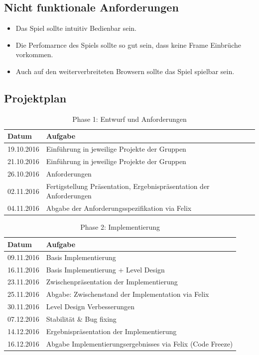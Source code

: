 \subsection{Nicht funktionale Anforderungen}
\begin{itemize}
	\item Das Spiel sollte intuitiv Bedienbar sein.
	\item Die Perfomarnce des Spiels sollte so gut sein, dass keine Frame Einbrüche vorkommen.
	\item Auch auf den weiterverbreiteten Browsern sollte das Spiel spielbar sein.
\end{itemize}
\subsection{Projektplan}
\begin{table}[h]
	\begin{tabular}{l|l}
		\toprule
		\textbf{Datum}& \textbf{Aufgabe}\\
		\midrule
		19.10.2016 & Einführung in jeweilige Projekte der Gruppen 	\\ 
		21.10.2016 & Einführung in jeweilige Projekte der Gruppen	\\
		26.10.2016 & Anforderungen	\\ 
		02.11.2016 & Fertigstellung Präsentation, Ergebnispräsentation der Anforderungen \\
		04.11.2016 & Abgabe der Anforderungsspezifikation via Felix \\
		\bottomrule
	\end{tabular}
	\caption{Phase 1: Entwurf und Anforderungen}
\end{table}
\begin{table}[h]
	\begin{tabular}{l|l}
		\toprule
		\textbf{Datum}& \textbf{Aufgabe}\\
		\midrule
		09.11.2016 & Basis Implementierung 	\\ 
		16.11.2016 & Basis Implementierung + Level Design	\\
		23.11.2016 & Zwischenpräsentation der Implementierung	\\ 
		25.11.2016 & Abgabe: Zwischenstand der Implementation via Felix\\
		30.11.2016 & Level Design Verbesserungen \\
		07.12.2016 & Stabilität \& Bug fixing \\
		14.12.2016 & Ergebnispräsentation der Implementierung \\
		16.12.2016 & Abgabe Implementierungsergebnisses via Felix (Code Freeze) \\
		\bottomrule
	\end{tabular}
	\caption{Phase 2: Implementierung}
\end{table}
